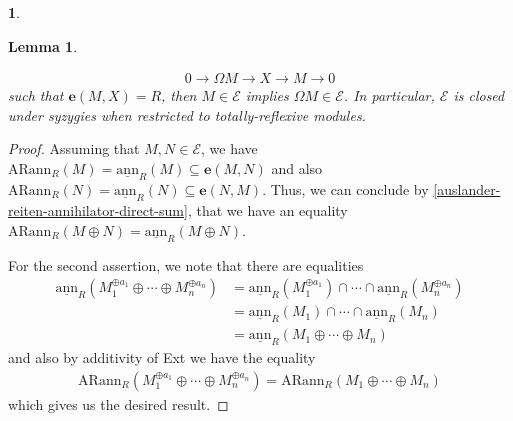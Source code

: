 \documentclass[12pt]{amsart}
\newcommand{\sann}{\underline{\mathrm{ann}}}
\newcommand{\arann}{\mathrm{ARann}}
\newcommand{\EE}{\mathcal{E}}
\newtheorem{lemma}[theorem]{Lemma}
\theoremstyle{definition}
\newtheorem{chunk}[theorem]{}
\numberwithin{equation}{theorem}
\def\e{\boldsymbol{e}}
\begin{document}
\begin{chunk}
\begin{lemma}
\begin{enumerate}
\begin{align*}
            0 \to \Omega M \to X \to M \to 0
            \end{align*}
            such that $\e(M,X) = R$, then $M \in \EE$ implies $\Omega M \in \EE$. In particular, $\EE$ is closed under syzygies when restricted to totally-reflexive modules.
        \end{enumerate}
    \end{lemma}
    \begin{proof}
        Assuming that $M, N \in \EE$, we have $\arann_R(M) = \sann_R(M) \subseteq \e(M,N)$ and also $\arann_R(N) = \sann_R(N) \subseteq \e(N,M)$. Thus, we can conclude by \ref{auslander-reiten-annihilator-direct-sum}, that we have an equality $\arann_R(M \oplus N) = \sann_R(M \oplus N)$. 
        
        For the second assertion, we note that there are equalities
        \begin{align*}
        \sann_R(M_1^{\oplus a_1} \oplus \cdots \oplus M_n^{\oplus a_n}) &= \sann_R(M_1^{\oplus a_1}) \cap \cdots \cap \sann_R(M_n^{\oplus a_n})\\ &= \sann_R(M_1) \cap \cdots \cap \sann_R(M_n) \\
        & = \sann_R(M_1 \oplus \cdots \oplus M_n) 
        \end{align*}
        and also by additivity of Ext we have the equality 
        \begin{align*}
        \arann_R(M_1^{\oplus a_1} \oplus \cdots \oplus M_n^{\oplus a_n}) = \arann_R(M_1 \oplus \cdots \oplus M_n)
        \end{align*}
        which gives us the desired result.
        


\end{proof}
\end{chunk}
\end{document}
